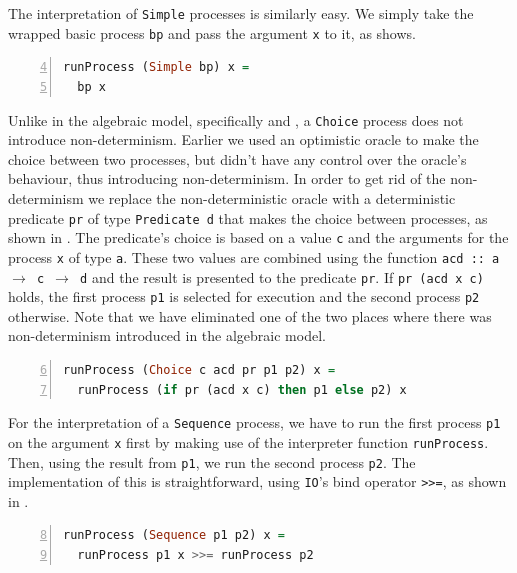 The interpretation of \texttt{Simple} processes is similarly easy. We simply take the wrapped basic process \texttt{bp} and pass the argument \texttt{x} to it, as  shows.
\begin{lstlisting}[language=Haskell,caption=Implementation of the interpreter for \texttt{Simple} processes.,label=lst:local_runprocess_simple,numbers=left,frame=bt,firstnumber=4]
runProcess (Simple bp) x =
  bp x
\end{lstlisting}

Unlike in the algebraic model, specifically  and , a \texttt{Choice} process does not introduce non-determinism. Earlier we used an optimistic oracle to make the choice between two processes, but didn't have any control over the oracle's behaviour, thus introducing non-determinism. In order to get rid of the non-determinism we replace the non-deterministic oracle with a deterministic predicate \texttt{pr} of type \texttt{Predicate d} that makes the choice between processes, as shown in . The predicate's choice is based on a value \texttt{c} and the arguments for the process \texttt{x} of type \texttt{a}. These two values are combined using the function \texttt{acd :: a $\to$ c $\to$ d} and the result is presented to the predicate \texttt{pr}. If \texttt{pr (acd x c)} holds, the first process \texttt{p1} is selected for execution and the second process \texttt{p2} otherwise. Note that we have eliminated one of the two places where there was non-determinism introduced in the algebraic model.
\begin{lstlisting}[language=Haskell,caption=Implementation of the interpreter for \texttt{Choice} processes.,label=lst:local_runprocess_choice,numbers=left,frame=bt,firstnumber=6]
runProcess (Choice c acd pr p1 p2) x =
  runProcess (if pr (acd x c) then p1 else p2) x
\end{lstlisting}

For the interpretation of a \texttt{Sequence} process, we have to run the first process \texttt{p1} on the argument \texttt{x} first by making use of the interpreter function \texttt{runProcess}. Then, using the result from \texttt{p1}, we run the second process \texttt{p2}. The implementation of this is straightforward, using \texttt{IO}'s bind operator \texttt{>}\texttt{>=}, as shown in .
\begin{lstlisting}[language=Haskell,caption=Implementation of the interpreter for \texttt{Sequence} processes.,label=lst:local_runprocess_sequence,numbers=left,frame=bt,firstnumber=8]
runProcess (Sequence p1 p2) x =
  runProcess p1 x >>= runProcess p2
\end{lstlisting}

